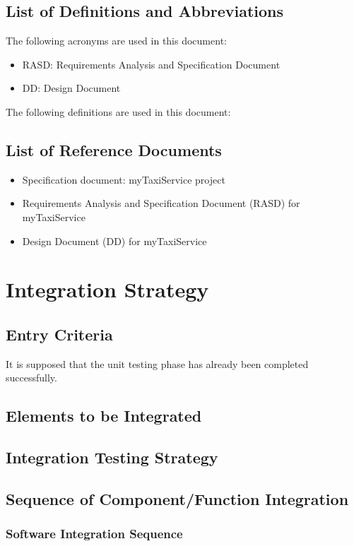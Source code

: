 \documentclass[a4paper,11pt]{report} %
\begin{document}
	\subsection{List of Definitions and Abbreviations}
		The following acronyms are used in this document:
		\begin{itemize}
			\item RASD: Requirements Analysis and Specification Document
			\item DD: Design Document
		\end{itemize}
		The following definitions are used in this document:
		
	\subsection{List of Reference Documents}
		\begin{itemize}
			\item Specification document: myTaxiService project
			\item Requirements Analysis and Specification Document (RASD) for myTaxiService
			\item Design Document (DD) for myTaxiService
		\end{itemize}
	
	
	\section{Integration Strategy}
	\subsection{Entry Criteria}
		It is supposed that the unit testing phase has already been completed successfully.
	\subsection{Elements to be Integrated}
	\subsection{Integration Testing Strategy}
	\subsection{Sequence of Component/Function Integration}
	\subsubsection{Software Integration Sequence}
\end{document}
